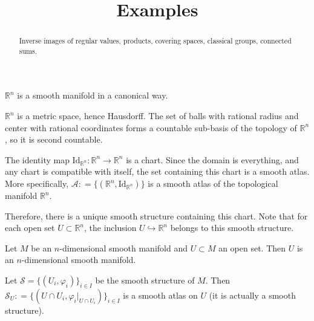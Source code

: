 \documentclass{ximera}
\title{Examples}
\begin{document}
    \begin{abstract}  Inverse images of regular values, products, covering spaces, classical groups, connected sums.  \end{abstract}
    \maketitle

\begin{example}
$\mathbb{R}^n$ is a smooth manifold in a canonical way. %
\begin{solution}
    $\mathbb{R}^n$ is a metric space,  hence Hausdorff.   The set of balls with rational radius and center with rational coordinates forms a countable sub-basis of the topology of $\mathbb{R}^n$, so it is second countable. 
    
    The identity map $\text{Id}_{\mathbb{R}^n} : \mathbb{R}^n \to \mathbb{R}^n$ is a chart. Since the domain is everything, and any chart is compatible with itself, the set containing this chart is a smooth atlas. More specifically, $\mathcal{A} : = \{ (\mathbb{R}^n, \text{Id}_{\mathbb{R}^n} ) \}$ is a smooth atlas of the topological manifold $\mathbb{R}^n$. 
    
    Therefore, there is a unique smooth structure containing this chart. Note that for each open set $U \subset \mathbb{R}^n$, the inclusion $U \hookrightarrow \mathbb{R}^n$ belongs to this smooth structure.
\end{solution}
\end{example}



\begin{example}
Let $M$ be an $n$-dimensional smooth manifold and $U \subset M$ an open set. Then $U$ is an $n$-dimensional smooth manifold. 
\begin{solution}
    Let $\mathcal{S} = \{ (U_i, \varphi _i ) \} _{i \in I }$ be the smooth structure of $M$. Then $\mathcal{S}_U : = \{ ( U \cap U_i , \varphi_i \vert _{U \cap U_i}  ) \} _{i \in I }$ is a smooth atlas on $U$ (it is actually a smooth structure). 
\end{solution}
\end{example}
\end{document}
